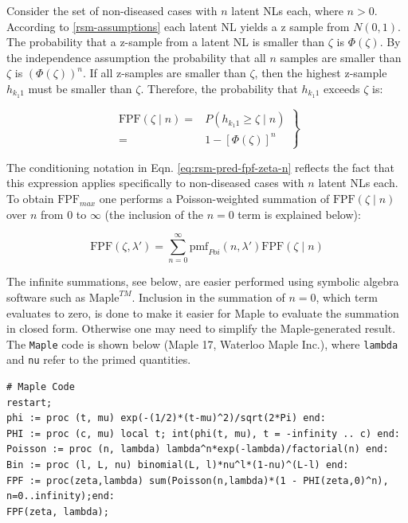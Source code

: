 \documentclass[
]{book}
\begin{document}
Consider the set of non-diseased cases with \(n\) latent NLs each, where \(n > 0\). According to \ref{rsm-assumptions} each latent NL yields a z sample from \(N(0,1)\). The probability that a z-sample from a latent NL is smaller than \(\zeta\) is \(\Phi(\zeta)\). By the independence assumption the probability that all \(n\) samples are smaller than \(\zeta\) is \((\Phi(\zeta))^n\). If all z-samples are smaller than \(\zeta\), then the highest z-sample \(h_{k_1 1}\) must be smaller than \(\zeta\). Therefore, the probability that \(h_{k_1 1}\) exceeds \(\zeta\) is:

\begin{equation}
\left. 
\begin{aligned}
\text{FPF}\left (\zeta \mid n \right ) =& P\left ( h_{k_1 1} \geq  \zeta \mid n\right ) \\
=& 1 - \left [ \Phi\left ( \zeta \right )  \right ]^n
\end{aligned}
\right \}
\label{eq:rsm-pred-fpf-zeta-n}
\end{equation}

The conditioning notation in Eqn. \eqref{eq:rsm-pred-fpf-zeta-n} reflects the fact that this expression applies specifically to non-diseased cases with \(n\) latent NLs each. To obtain \(\text{FPF}_{max}\) one performs a Poisson-weighted summation of \(\text{FPF}\left (\zeta \mid n \right )\) over \(n\) from 0 to \(\infty\) (the inclusion of the \(n = 0\) term is explained below):

\begin{equation}
\text{FPF}\left (\zeta, \lambda' \right ) = \sum_{n=0}^{\infty} \text{pmf}_{Poi} \left ( n, \lambda' \right )\text{FPF}\left (\zeta \mid n \right )
\label{eq:rsm-pred-fpf-zeta-before-maple}
\end{equation}

The infinite summations, see below, are easier performed using symbolic algebra software such as \(\text{Maple}^{TM}\). Inclusion in the summation of \(n = 0\), which term evaluates to zero, is done to make it easier for Maple to evaluate the summation in closed form. Otherwise one may need to simplify the Maple-generated result. The \texttt{Maple} code is shown below (Maple 17, Waterloo Maple Inc.), where \texttt{lambda} and \texttt{nu} refer to the primed quantities.

\begin{verbatim}
# Maple Code
restart;
phi := proc (t, mu) exp(-(1/2)*(t-mu)^2)/sqrt(2*Pi) end: 
PHI := proc (c, mu) local t; int(phi(t, mu), t = -infinity .. c) end: 
Poisson := proc (n, lambda) lambda^n*exp(-lambda)/factorial(n) end: 
Bin := proc (l, L, nu) binomial(L, l)*nu^l*(1-nu)^(L-l) end:
FPF := proc(zeta,lambda) sum(Poisson(n,lambda)*(1 - PHI(zeta,0)^n), n=0..infinity);end:
FPF(zeta, lambda);   
\end{verbatim}
\end{document}
